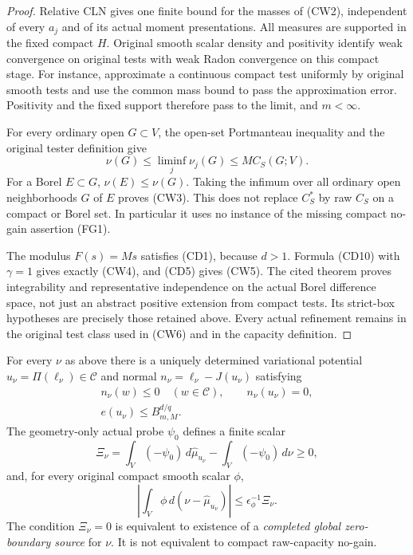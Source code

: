 \begin{proof}
Relative CLN gives one finite bound for the masses of (CW2),
independent of every $a_j$ and of its actual moment presentations.
All measures are supported in the fixed compact $H$. Original
smooth scalar density and positivity identify weak convergence
on original tests with weak Radon convergence on this compact
stage. For instance, approximate a continuous compact test
uniformly by original smooth tests and use the common mass bound
to pass the approximation error. Positivity and the fixed support
therefore pass to the limit, and $m<\infty$.

For every ordinary open $G\subset V$, the open-set Portmanteau
inequality and the original tester definition give
\[
    \nu(G)\leq\liminf_j\nu_j(G)
        \leq M C_S(G;V).
 \tag{CW6}
\]
For a Borel $E\subset G$, $\nu(E)\leq\nu(G)$.
Taking the infimum over all ordinary open neighborhoods $G$
of $E$ proves (CW3). This does not replace $C_S^*$ by raw
$C_S$ on a compact or Borel set. In particular it uses no
instance of the missing compact no-gain assertion (FG1).

The modulus $F(s)=Ms$ satisfies (CD1), because
$d>1$. Formula (CD10) with $\gamma=1$ gives exactly (CW4),
and (CD5) gives (CW5). The cited theorem proves integrability
and representative independence on the actual Borel difference
space, not just an abstract positive extension from compact
tests. Its strict-box hypotheses are precisely those retained
above. Every actual refinement remains in the original test
class used in (CW6) and in the capacity definition.
\end{proof}

\begin{corollary}
\label{cor:r12-cluster-normal-pair}
For every $\nu$ as above there is a uniquely determined
variational potential $u_\nu=\Pi(\ell_\nu)\in\mathscr C$ and
normal $n_\nu=\ell_\nu-J(u_\nu)$ satisfying
\[
 \begin{gathered}
 n_\nu(w)\leq0\quad(w\in\mathscr C),\qquad n_\nu(u_\nu)=0,\\
                  e(u_\nu)\leq B_{m,M}^{d/q}.
 \end{gathered}
 \tag{CW7}
\]
The geometry-only actual probe $\psi_0$ defines a finite scalar
\[
 \Xi_\nu=\int_V(-\psi_0)\,d\widehat\mu_{u_\nu}
                       -\int_V(-\psi_0)\,d\nu\geq0,
 \tag{CW8}
\]
and, for every original compact smooth scalar $\phi$,
\[
 \left|\int_V\phi\,d(\nu-\widehat\mu_{u_\nu})\right|
                   \leq\epsilon_\phi^{-1}\Xi_\nu.
 \tag{CW9}
\]
The condition $\Xi_\nu=0$ is equivalent to existence of a
\emph{completed global zero-boundary source} for $\nu$.
It is not equivalent to compact raw-capacity no-gain.
\end{corollary}

